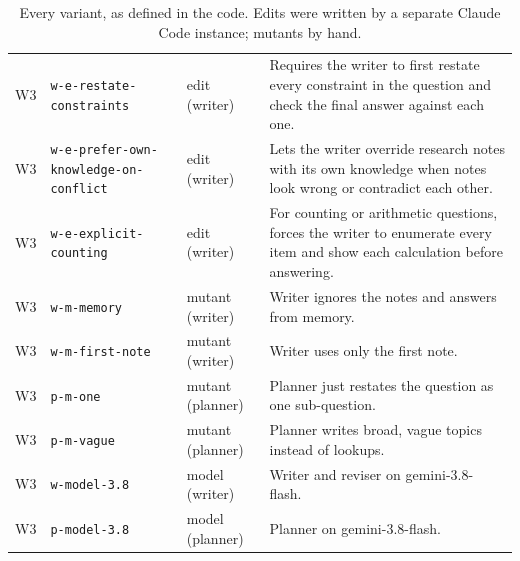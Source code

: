 \begin{table}[p]
\begin{tabular}{@{}lllp{6.3cm}@{}}
W3 & \texttt{w-e-restate-constraints} & edit (writer) & Requires the writer to first restate every constraint in the question and check the final answer against each one. \\
W3 & \texttt{w-e-prefer-own-knowledge-on-conflict} & edit (writer) & Lets the writer override research notes with its own knowledge when notes look wrong or contradict each other. \\
W3 & \texttt{w-e-explicit-counting} & edit (writer) & For counting or arithmetic questions, forces the writer to enumerate every item and show each calculation before answering. \\
W3 & \texttt{w-m-memory} & mutant (writer) & Writer ignores the notes and answers from memory. \\
W3 & \texttt{w-m-first-note} & mutant (writer) & Writer uses only the first note. \\
W3 & \texttt{p-m-one} & mutant (planner) & Planner just restates the question as one sub-question. \\
W3 & \texttt{p-m-vague} & mutant (planner) & Planner writes broad, vague topics instead of lookups. \\
W3 & \texttt{w-model-3.8} & model (writer) & Writer and reviser on gemini-3.8-flash. \\
W3 & \texttt{p-model-3.8} & model (planner) & Planner on gemini-3.8-flash. \\
\bottomrule
\end{tabular}
\caption{Every variant, as defined in the code. Edits were written by a separate Claude Code instance; mutants by hand.}
\label{tab:variants}
\end{table}
